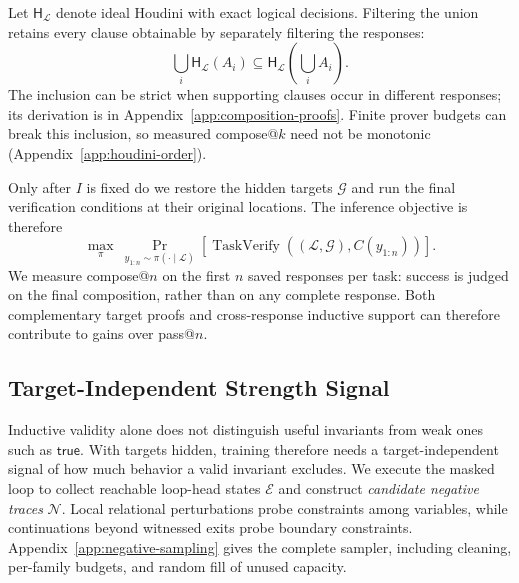 Let \(\mathsf H_{\mathcal L}\) denote ideal Houdini with exact logical
decisions.  Filtering the union retains every clause obtainable by separately
filtering the responses:
\begin{equation}
 \bigcup_i\mathsf H_{\mathcal L}(A_i)
 \subseteq\mathsf H_{\mathcal L}\!\left(\bigcup_i A_i\right).
 \label{eq:main-pooling-inclusion}
\end{equation}
The inclusion can be strict when supporting clauses occur in different
responses; its derivation is in Appendix~\ref{app:composition-proofs}.
Finite prover budgets can break this inclusion, so measured compose@\(k\)
need not be monotonic (Appendix~\ref{app:houdini-order}).

Only after \(I\) is fixed do we restore the hidden targets \(\mathcal G\)
and run the final verification conditions at their original locations.  The
inference objective is therefore
\[
  \max_\pi\ \Pr_{y_{1:n}\sim\pi(\cdot\mid\mathcal L)}
  [\operatorname{TaskVerify}((\mathcal L,\mathcal G),C(y_{1:n}))].
\]
We measure compose@\(n\) on the first \(n\) saved responses per task:
success is judged on the final composition, rather than on any complete
response.  Both complementary
target proofs and cross-response inductive support can therefore contribute
to gains over pass@\(n\).

\subsection{Target-Independent Strength Signal}
\label{sec:method:sampler}

Inductive validity alone does not distinguish useful invariants from weak
ones such as \(\mathsf{true}\).  With targets hidden, training therefore
needs a target-independent signal of how much behavior a valid invariant
excludes.  We execute the masked loop to collect reachable loop-head states
\(\mathcal E\) and construct \emph{candidate negative traces}
\(\mathcal N\).  Local relational perturbations probe constraints among
variables, while continuations beyond witnessed exits probe boundary
constraints.  Appendix~\ref{app:negative-sampling} gives the complete sampler,
including cleaning, per-family budgets, and random fill of unused capacity.

